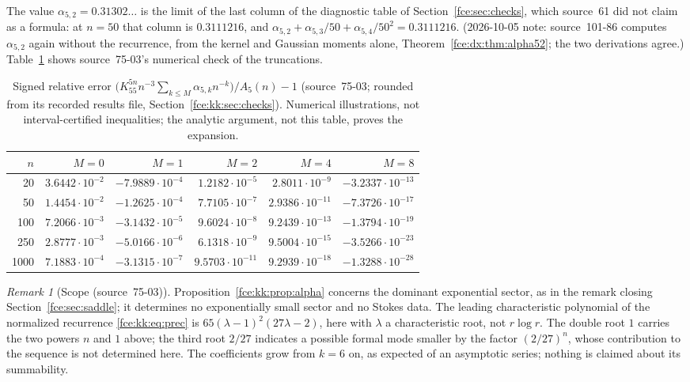 \documentclass[11pt,a4paper]{article}
\numberwithin{equation}{section}
\theoremstyle{definition}\newtheorem{definition}[theorem]{Definition}
\theoremstyle{remark}\newtheorem{remark}[theorem]{Remark}
\begin{document}
The value $\alpha_{5,2}=0.31302\ldots$ is the limit of the last column of
the diagnostic table of Section~\ref{fce:sec:checks}, which source~61 did not
claim as a formula: at $n=50$ that column is $0.3111216$, and
$\alpha_{5,2}+\alpha_{5,3}/50+\alpha_{5,4}/50^2=0.3111216$.
(2026-10-05 note: source~101-86 computes $\alpha_{5,2}$ again without the
recurrence, from the kernel and Gaussian moments alone,
Theorem~\ref{fce:dx:thm:alpha52}; the two derivations agree.)
Table~\ref{fce:kk:tab:errors} shows source~75-03's numerical check of the
truncations.

\begin{table}[!htbp]
\centering\small
\caption{Signed relative error $\bigl(K_55^{5n}n^{-3}\sum_{k\le M}\alpha_{5,k}n^{-k}\bigr)/A_5(n)-1$
(source~75-03; rounded from its recorded results file,
Section~\ref{fce:kk:sec:checks}). Numerical illustrations, not interval-certified
inequalities; the analytic argument, not this table, proves the
expansion.}\label{fce:kk:tab:errors}
\begin{tabular}{@{}rrrrrr@{}}
\toprule
$n$&$M=0$&$M=1$&$M=2$&$M=4$&$M=8$\\
\midrule
20&$3.6442\cdot10^{-2}$&$-7.9889\cdot10^{-4}$&$1.2182\cdot10^{-5}$&$2.8011\cdot10^{-9}$&$-3.2337\cdot10^{-13}$\\
50&$1.4454\cdot10^{-2}$&$-1.2625\cdot10^{-4}$&$7.7105\cdot10^{-7}$&$2.9386\cdot10^{-11}$&$-7.3726\cdot10^{-17}$\\
100&$7.2066\cdot10^{-3}$&$-3.1432\cdot10^{-5}$&$9.6024\cdot10^{-8}$&$9.2439\cdot10^{-13}$&$-1.3794\cdot10^{-19}$\\
250&$2.8777\cdot10^{-3}$&$-5.0166\cdot10^{-6}$&$6.1318\cdot10^{-9}$&$9.5004\cdot10^{-15}$&$-3.5266\cdot10^{-23}$\\
1000&$7.1883\cdot10^{-4}$&$-3.1315\cdot10^{-7}$&$9.5703\cdot10^{-11}$&$9.2939\cdot10^{-18}$&$-1.3288\cdot10^{-28}$\\
\bottomrule
\end{tabular}
\end{table}

\begin{remark}[Scope (source~75-03)]\label{fce:kk:rem:scope}
Proposition~\ref{fce:kk:prop:alpha} concerns the dominant exponential
sector, as in the remark closing Section~\ref{fce:sec:saddle}; it determines
no exponentially small sector and no Stokes data. The leading characteristic
polynomial of the normalized recurrence \eqref{fce:kk:eq:prec} is
$65(\lambda-1)^2(27\lambda-2)$, here with $\lambda$ a characteristic root,
not $r\log r$. The double root $1$ carries the two powers $n$ and $1$
above; the third root $2/27$ indicates a possible formal mode smaller by
the factor $(2/27)^n$, whose contribution to the sequence is not determined
here. The coefficients grow from $k=6$ on, as expected of an asymptotic
series; nothing is claimed about its summability.
\end{remark}
\end{document}
